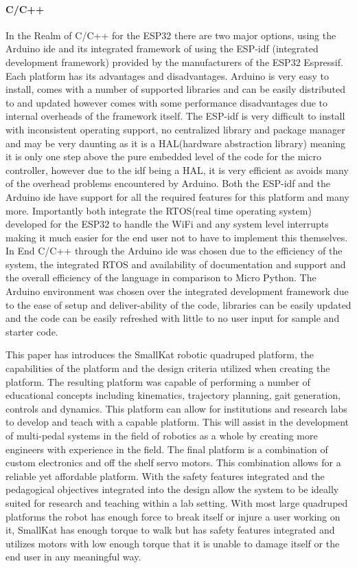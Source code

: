 \documentclass[conference]{IEEEtran}
\begin{document}
\paragraph*{C/C++}
    In the Realm of C/C++ for the ESP32 there are two major options, using the Arduino ide and its integrated framework of using the ESP-idf (integrated development framework) provided by the manufacturers of the ESP32 Espressif. Each platform has its advantages and disadvantages. Arduino is very easy to install, comes with a number of supported libraries and can be easily distributed to and updated however comes with some performance disadvantages due to internal overheads of the framework itself. The ESP-idf is very difficult to install with inconsistent operating support, no centralized library and package manager and may be very daunting as it is a HAL(hardware abstraction library) meaning it is only one step above the pure embedded level of the code for the micro controller, however due to the idf being a HAL, it is very efficient as avoids many of the overhead problems encountered by Arduino.
    Both the ESP-idf and the Arduino ide have support for all the required features for this platform and many more. Importantly both integrate the RTOS(real time operating system) developed for the ESP32 to handle the WiFi and any system level interrupts making it much easier for the end user not to have to implement this themselves. \newline\newline
In End C/C++ through the Arduino ide was chosen due to the efficiency of the system, the integrated RTOS and availability of documentation and support and the overall efficiency of the language in comparison to Micro Python. The Arduino environment was chosen over the integrated development framework due to the ease of setup and deliver-ability of the code, libraries can be easily updated and the code can be easily refreshed with little to no user input for sample and starter code.


    This paper has introduces the SmallKat robotic quadruped platform, the capabilities of the platform and the design criteria utilized when creating the platform. The resulting platform was capable of performing a number of educational concepts including kinematics, trajectory planning, gait generation, controls and dynamics. This platform can allow for institutions and research labs to develop and teach with a capable platform. This will assist in the development of multi-pedal systems in the field of robotics as a whole by creating more engineers with experience in the field.
    The final platform is a combination of custom electronics and off the shelf servo motors. This combination allows for a reliable yet affordable platform. With the safety features integrated and the pedagogical objectives integrated into the design allow the system to be ideally suited for research and teaching within a lab setting. With most large quadruped platforms the robot has enough force to break itself or injure a user working on it, SmallKat has enough torque to walk but has safety features integrated and utilizes motors with low enough torque that it is unable to damage itself or the end user in any meaningful way.
\end{document}
